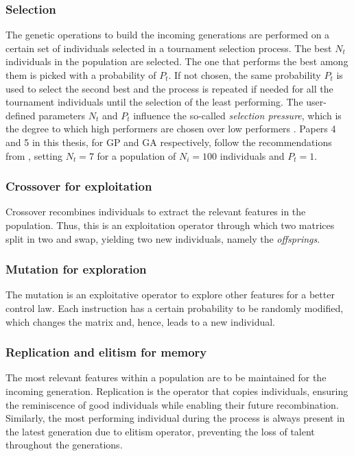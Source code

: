 \subsubsection*{Selection}
The genetic operations to build the incoming generations are performed on a certain set of individuals selected in a tournament selection process. The best $N_t$ individuals in the population are selected. The one that performs the best among them is picked with a probability of $P_t$. If not chosen, the same probability $P_t$ is used to select the second best and the process is repeated if needed for all the tournament individuals until the selection of the least performing. The user-defined parameters $N_t$ and $P_t$ influence the so-called \textit{selection pressure}, which is the degree to which high performers are chosen over low performers \citep{Wahde2008book}. Papers 4 and 5 in this thesis, for GP and GA respectively, follow the recommendations from \citet{duriez2017book}, setting $N_t = 7$ for a population of $N_i = 100$ individuals and $P_t = 1$.

\subsubsection*{Crossover for exploitation}
Crossover recombines individuals to extract the relevant features in the population. Thus, this is an exploitation operator through which two matrices split in two and swap, yielding two new individuals, namely the \textit{offsprings}.

\subsubsection*{Mutation for exploration}
The mutation is an exploitative operator to explore other features for a better control law. Each instruction has a certain probability to be randomly modified, which changes the matrix and, hence, leads to a new individual.

\subsubsection*{Replication and elitism for memory}
The most relevant features within a population are to be maintained for the incoming generation. Replication is the operator that copies individuals, ensuring the reminiscence of good individuals while enabling their future recombination. Similarly, the most performing individual during the process is always present in the latest generation due to elitism operator, preventing the loss of talent throughout the generations.
